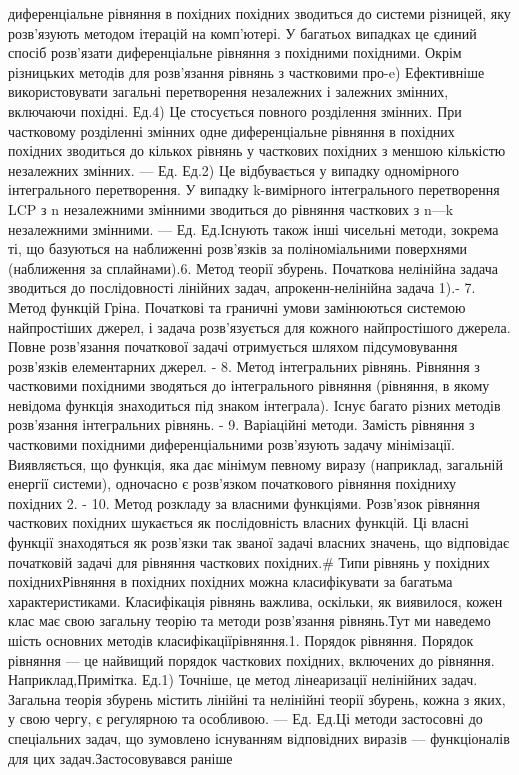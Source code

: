 \documentclass[
  ukrainian,
]{article}
\begin{document}
диференціальне рівняння в похідних похідних зводиться до системи
різницей, яку розв'язують методом ітерацій на комп'ютері. У багатьох
випадках це єдиний спосіб розв'язати диференціальне рівняння з похідними
похідними. Окрім різницьких методів для розв'язання рівнянь з частковими
про-e) Ефективніше використовувати загальні перетворення незалежних і
залежних змінних, включаючи похідні. Ед.4) Це стосується повного
розділення змінних. При частковому розділенні змінних одне
диференціальне рівняння в похідних похідних зводиться до кількох рівнянь
у часткових похідних з меншою кількістю незалежних змінних. --- Ед.
Ед.2) Це відбувається у випадку одномірного інтегрального перетворення.
У випадку k-вимірного інтегрального перетворення LCP з n незалежними
змінними зводиться до рівняння часткових з n---k незалежними змінними.
--- Ед. Ед.Існують також інші чисельні методи, зокрема ті, що базуються
на наближенні розв'язків за поліноміальними поверхнями (наближення за
сплайнами).6. Метод теорії збурень. Початкова нелінійна задача зводиться
до послідовності лінійних задач, апрокенн-нелінійна задача 1).- 7. Метод
функцій Гріна. Початкові та граничні умови замінюються системою
найпростіших джерел, і задача розв'язується для кожного найпростішого
джерела. Повне розв'язання початкової задачі отримується шляхом
підсумовування розв'язків елементарних джерел. - 8. Метод інтегральних
рівнянь. Рівняння з частковими похідними зводяться до інтегрального
рівняння (рівняння, в якому невідома функція знаходиться під знаком
інтеграла). Існує багато різних методів розв'язання інтегральних
рівнянь. - 9. Варіаційні методи. Замість рівняння з частковими похідними
диференціальними розв'язують задачу мінімізації. Виявляється, що
функція, яка дає мінімум певному виразу (наприклад, загальній енергії
системи), одночасно є розв'язком початкового рівняння похідниху похідних
2. - 10. Метод розкладу за власними функціями. Розв'язок рівняння
часткових похідних шукається як послідовність власних функцій. Ці власні
функції знаходяться як розв'язки так званої задачі власних значень, що
відповідає початковій задачі для рівняння часткових похідних.\# Типи
рівнянь у похідних похіднихРівняння в похідних похідних можна
класифікувати за багатьма характеристиками. Класифікація рівнянь
важлива, оскільки, як виявилося, кожен клас має свою загальну теорію та
методи розв'язання рівнянь.Тут ми наведемо шість основних методів
класифікаціїрівняння.1. Порядок рівняння. Порядок рівняння --- це
найвищий порядок часткових похідних, включених до рівняння.
Наприклад,Примітка. Ед.1) Точніше, це метод лінеаризації нелінійних
задач. Загальна теорія збурень містить лінійні та нелінійні теорії
збурень, кожна з яких, у свою чергу, є регулярною та особливою. --- Ед.
Ед.Ці методи застосовні до спеціальних задач, що зумовлено існуванням
відповідних виразів --- функціоналів для цих задач.Застосовувався раніше
\end{document}
